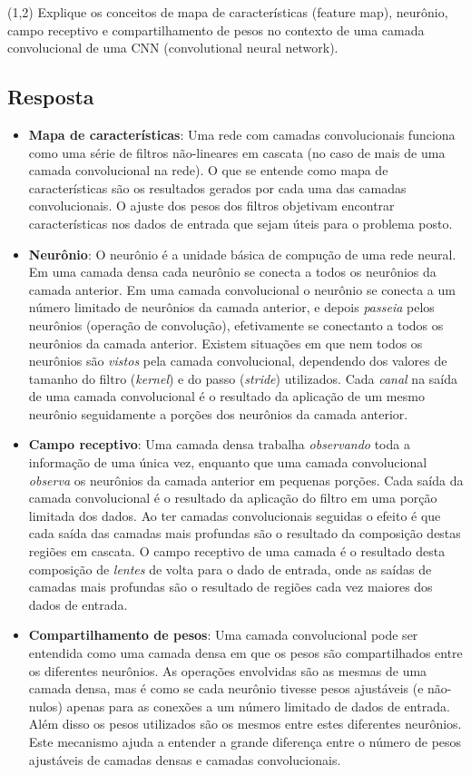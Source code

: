 \documentclass[final,3p]{elsarticle}
\numberwithin{equation}{section}
\begin{document}
    (1,2) Explique os conceitos de mapa de características (feature map), neurônio, campo receptivo e compartilhamento de pesos no contexto de uma camada convolucional de uma CNN (convolutional neural network).

    \subsection{Resposta}

        \begin{itemize}
            \item \textbf{Mapa de características}: Uma rede com camadas convolucionais funciona como uma série de filtros não-lineares em cascata (no caso de mais de uma camada convolucional na rede). O que se entende como mapa de características são os resultados gerados por cada uma das camadas convolucionais. O ajuste dos pesos dos filtros objetivam encontrar características nos dados de entrada que sejam úteis para o problema posto.
            \item \textbf{Neurônio}: O neurônio é a unidade básica de compução de uma rede neural. Em uma camada densa cada neurônio se conecta a todos os neurônios da camada anterior. Em uma camada convolucional o neurônio se conecta a um número limitado de neurônios da camada anterior, e depois \emph{passeia} pelos neurônios (operação de convolução), efetivamente se conectanto a todos os neurônios da camada anterior. Existem situações em que nem todos os neurônios são \emph{vistos} pela camada convolucional, dependendo dos valores de tamanho do filtro (\emph{kernel}) e do passo (\emph{stride}) utilizados. Cada \emph{canal} na saída de uma camada convolucional é o resultado da aplicação de um mesmo neurônio seguidamente a porções dos neurônios da camada anterior.
            \item \textbf{Campo receptivo}: Uma camada densa trabalha \emph{observando} toda a informação de uma única vez, enquanto que uma camada convolucional \emph{observa} os neurônios da camada anterior em pequenas porções. Cada saída da camada convolucional é o resultado da aplicação do filtro em uma porção limitada dos dados. Ao ter camadas convolucionais seguidas o efeito é que cada saída das camadas mais profundas são o resultado da composição destas regiões em cascata. O campo receptivo de uma camada é o resultado desta composição de \emph{lentes} de volta para o dado de entrada, onde as saídas de camadas mais profundas são o resultado de regiões cada vez maiores dos dados de entrada.
            \item \textbf{Compartilhamento de pesos}: Uma camada convolucional pode ser entendida como uma camada densa em que os pesos são compartilhados entre os diferentes neurônios. As operações envolvidas são as mesmas de uma camada densa, mas é como se cada neurônio tivesse pesos ajustáveis (e não-nulos) apenas para as conexões a um número limitado de dados de entrada. Além disso os pesos utilizados são os mesmos entre estes diferentes neurônios. Este mecanismo ajuda a entender a grande diferença entre o número de pesos ajustáveis de camadas densas e camadas convolucionais.
        \end{itemize}
\end{document}
